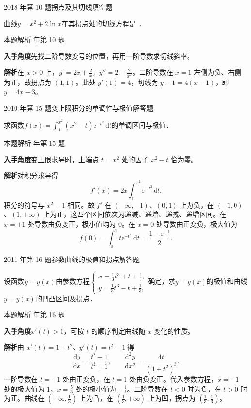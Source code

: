 \documentclass[UTF8,zihao=-4,fontset=fandol]{ctexart}
\newcommand{\blank}{\underline{\hspace{5em}}}
\newcommand{\QuestionPage}[6]{%
  \par\noindent\begin{minipage}{\linewidth}
  \raggedright
  {\small\textcolor{black!60}{#3\quad #5}\hfill\textcolor{accent}{#2}}\par\smallskip}
\newcommand{\QuestionEnd}{\end{minipage}\par\medskip}
\newcommand{\QuestionPage}[6]{%
  \clearpage
  {\small\textcolor{accent}{#1\hfill #2}}\par\medskip
  {\small\textcolor{black!60}{#3\quad #5\hfill #6}}\par\vspace{9bp}}
\newcommand{\QuestionEnd}{}
\newenvironment{QuestionSolution}[1]{%
  \clearpage
  {\small\textcolor{black!60}{本题解析\quad #1}}\par\medskip
}{\par\clearpage}
\begin{document}
\QuestionPage{2.6 函数性态的研究}{填空题}{2018 年第 10 题}{2}{拐点及其切线}{118 / 234}
曲线$y = x^2 + 2\ln x$在其拐点处的切线方程是 \blank{}．
\QuestionEnd

\begin{QuestionSolution}{2018 年第 10 题}
\textbf{入手角度}\quad 先找二阶导数变号的位置，再用一阶导数求切线斜率。

\textbf{解析}\quad 在 \(x>0\) 上，\(y'=2x+\frac{2}{x}\)，\(y''=2-\frac{2}{x^2}\)。二阶导数在 \(x=1\) 左侧为负、右侧为正，故拐点为 \((1,1)\)。此处 \(y'(1)=4\)，切线为 \(y-1=4(x-1)\)，即 \(\boxed{y=4x-3}\)。
\end{QuestionSolution}

\QuestionPage{2.6 函数性态的研究}{解答题}{2010 年第 15 题}{2}{变上限积分的单调性与极值}{119 / 234}
求函数$f(x) = \int_1^{x^2} \left(x^2 - t \right) \mathrm{e}^{- t^2} \,\mathrm{d} t$的单调区间与极值．
\QuestionEnd

\begin{QuestionSolution}{2010 年第 15 题}
\textbf{入手角度}\quad 变上限求导时，上端点 \(t=x^2\) 处的因子 \(x^2-t\) 恰为零。

\textbf{解析}\quad 对积分求导得
\[
f'(x)=2x\int_1^{x^2}\mathrm{e}^{-t^2}\,\mathrm{d}t.
\]
积分的符号与 \(x^2-1\) 相同。故 \(f'\) 在 \((-\infty,-1)\)、\((0,1)\) 上为负，在 \((-1,0)\)、\((1,+\infty)\) 上为正，这四个区间依次为递减、递增、递减、递增区间。在 \(x=\pm1\) 处导数由负变正，极小值均为 \(0\)。在 \(x=0\) 处导数由正变负，极大值为
\[
f(0)=\int_0^1 t \mathrm{e}^{-t^2}\,\mathrm{d}t=\frac{1-\mathrm{e}^{-1}}2.
\]
\end{QuestionSolution}

\QuestionPage{2.6 函数性态的研究}{解答题}{2011 年第 16 题}{2}{参数曲线的极值和拐点}{120 / 234}
设函数$y = y(x)$由参数方程$\begin{cases}
  x = \frac{1}{3}t^3 + t + \frac{1}{3}, \\
  y = \frac{1}{3}t^3 - t + \frac{1}{3},
\end{cases}$确定，求$y = y(x)$的极值和曲线$y = y(x)$的凹凸区间及拐点．
\QuestionEnd

\begin{QuestionSolution}{2011 年第 16 题}
\textbf{入手角度}\quad \(x'(t)>0\)，可按 \(t\) 的顺序判定曲线随 \(x\) 变化的性质。

\textbf{解析}\quad 由 \(x'(t)=1+t^2\)、\(y'(t)=t^2-1\) 得
\[
\frac{\mathrm{d}y}{\mathrm{d}x}=\frac{t^2-1}{t^2+1},\qquad
\frac{\mathrm{d}^2y}{\mathrm{d}x^2}=\frac{4t}{(1+t^2)^3}.
\]
一阶导数在 \(t=-1\) 处由正变负，在 \(t=1\) 处由负变正。代入参数方程，\(x=-1\) 处的极大值为 \(1\)，\(x=\frac{5}{3}\) 处的极小值为 \(-\frac{1}{3}\)。二阶导数在 \(t<0\) 时为负，在 \(t>0\) 时为正。曲线在 \((-\infty,\frac{1}{3})\) 上为凸，在 \((\frac{1}{3},+\infty)\) 上为凹，拐点为 \((\frac{1}{3},\frac{1}{3})\)。
\end{QuestionSolution}
\end{document}

